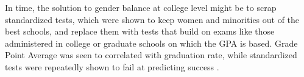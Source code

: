 \documentclass[utf8]{frontiersSCNS} %
\begin{document}




In time, the solution to gender balance at college level might be to scrap standardized tests, which were shown to keep women and minorities out of the best schools, and replace them with tests that  build on exams like those administered in college or graduate schools on which the GPA is based. Grade Point Average was seen to correlated with graduation rate, while standardized tests were repeatedly shown to fail at predicting success \citep{ripin1996fighting,miller2014test,petersen2018multi}. %
\end{document}
